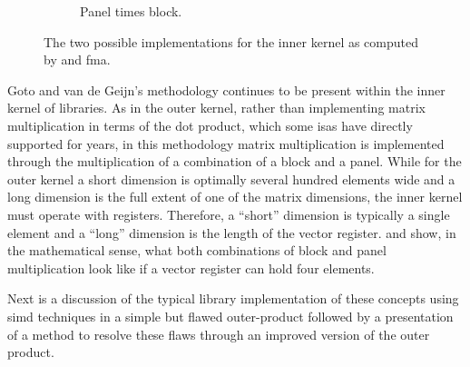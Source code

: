 \documentclass[\main/thesis.tex]{subfiles}
\begin{document}
\begin{figure}[t]
\begin{subfigure}{.45\linewidth}
    \caption{Panel times block.}
    \label{fig:gepbSimd}
  \end{subfigure}
  \hfill
  \caption[Inner kernel impelmentations viewed in register]{The two possible implementations for the inner kernel as computed by  and \acrshort{fma}.}
  \label{fig:gepb}
  \vspace{-0.15cm}
\end{figure}

Goto and van de Geijn's methodology continues to be present within the inner kernel of libraries.
As in the outer kernel, rather than implementing matrix multiplication in terms of the dot product, which some \glspl{isa} have directly supported for years\footnotemark, in this methodology matrix multiplication is implemented through the multiplication of a combination of a block and a panel.
While for the outer kernel a short dimension is optimally several hundred elements wide and a long dimension is the full extent of one of the matrix dimensions, the inner kernel must operate with registers.
Therefore, a ``short'' dimension is typically a single element and a ``long'' dimension is the length of the vector register.
 and  show, in the mathematical sense, what both combinations of block and panel multiplication look like if a vector register can hold four elements.

Next is a discussion of the typical library implementation of these concepts using \gls{simd} techniques in a simple but flawed outer-product followed by a presentation of a method to resolve these flaws through an improved version of the outer product.
\end{document}

